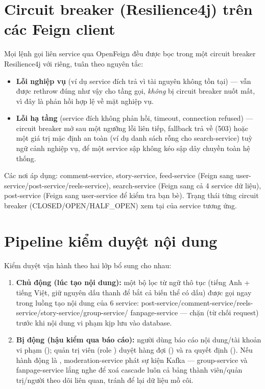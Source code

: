 \documentclass[12pt,a4paper]{report}
\begin{document}
\section{Circuit breaker (Resilience4j) trên các Feign client}

Mọi lệnh gọi liên service qua OpenFeign đều được bọc trong một circuit
breaker Resilience4j với  riêng, tuân theo nguyên tắc:

\begin{itemize}[nosep]
    \item \textbf{Lỗi nghiệp vụ} (ví dụ service đích trả 
    vì tài nguyên không tồn tại) — vẫn được rethrow đúng như vậy cho tầng gọi,
    \emph{không} bị circuit breaker nuốt mất, vì đây là phản hồi hợp lệ về
    mặt nghiệp vụ.
    \item \textbf{Lỗi hạ tầng} (service đích không phản hồi, timeout, connection
    refused) — circuit breaker mở sau một ngưỡng lỗi liên tiếp, fallback trả
    về  (503) hoặc một giá trị mặc định an
    toàn (ví dụ danh sách rỗng cho search-service) tuỳ ngữ cảnh nghiệp vụ, để
    một service sập không kéo sập dây chuyền toàn hệ thống.
\end{itemize}

Các nơi áp dụng: comment-service, story-service, feed-service (Feign sang
user-service/post-service/reels-service), search-service (Feign sang cả 4
service dữ liệu), post-service (Feign sang user-service để kiểm tra bạn bè).
Trạng thái từng circuit breaker (CLOSED/OPEN/HALF\_OPEN) xem tại
 của service tương ứng.

\section{Pipeline kiểm duyệt nội dung}

Kiểm duyệt vận hành theo hai lớp bổ sung cho nhau:

\begin{enumerate}[nosep]
    \item \textbf{Chủ động (lúc tạo nội dung):} một bộ lọc từ ngữ thô tục
    (tiếng Anh + tiếng Việt, giữ nguyên dấu thanh để bắt cả biến thể có dấu)
    được gọi ngay trong luồng tạo nội dung của 6 service:
    post-service/comment-service/reels-service/story-service/group-service/
    fanpage-service — chặn (từ chối request) trước khi nội dung vi phạm kịp
    lưu vào database.
    \item \textbf{Bị động (hậu kiểm qua báo cáo):} người dùng báo cáo nội
    dung/tài khoản vi phạm (); quản trị
    viên (role ) duyệt hàng đợi
    () và ra quyết định
    (). Nếu hành động là
    , moderation-service phát sự kiện Kafka
     — group-service và fanpage-service lắng nghe để
    xoá cascade luôn cả bảng thành viên/quản trị/người theo dõi liên quan,
    tránh để lại dữ liệu mồ côi.
\end{enumerate}
\end{document}
